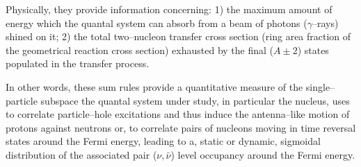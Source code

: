 %








 Physically, they provide  information concerning: 1) the maximum amount of energy which the quantal system can absorb from a beam of photons ($\gamma$--rays) shined on it; 2) the total two--nucleon transfer cross section (ring area fraction of the geometrical reaction cross section) exhausted by the final ($A\pm2$) states populated in the transfer process.







In other words, these sum rules provide a quantitative measure of the single--particle subspace the quantal system under study, in particular the nucleus, uses to correlate particle--hole excitations and thus induce the antenna--like motion of protons against neutrons or, to correlate pairs of nucleons moving in time reversal states around the Fermi energy, leading to a, static or dynamic, sigmoidal distribution of the associated pair ($\nu,\bar{\nu}$) level occupancy around the Fermi energy. 


